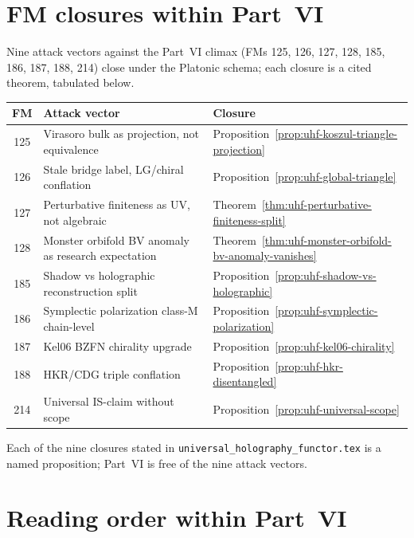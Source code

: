 \section{FM closures within Part~VI}
\label{sec:part-vi-fm-closures}

Nine attack vectors against the Part~VI climax (FMs 125, 126, 127,
128, 185, 186, 187, 188, 214) close under the Platonic schema; each
closure is a cited theorem, tabulated below.

\begin{center}
\begin{tabular}{c|p{5.5cm}|p{6.5cm}}
\hline
\textbf{FM} & \textbf{Attack vector} & \textbf{Closure} \\
\hline
125 & Virasoro bulk as projection, not equivalence & Proposition~\ref{prop:uhf-koszul-triangle-projection} \\
126 & Stale bridge label, LG/chiral conflation
 & Proposition~\ref{prop:uhf-global-triangle} \\
127 & Perturbative finiteness as UV, not algebraic
 & Theorem~\ref{thm:uhf-perturbative-finiteness-split} \\
128 & Monster orbifold BV anomaly as research expectation
 & Theorem~\ref{thm:uhf-monster-orbifold-bv-anomaly-vanishes} \\
185 & Shadow vs holographic reconstruction split
 & Proposition~\ref{prop:uhf-shadow-vs-holographic} \\
186 & Symplectic polarization class-M chain-level
 & Proposition~\ref{prop:uhf-symplectic-polarization} \\
187 & Kel06 BZFN chirality upgrade
 & Proposition~\ref{prop:uhf-kel06-chirality} \\
188 & HKR/CDG triple conflation
 & Proposition~\ref{prop:uhf-hkr-disentangled} \\
214 & Universal IS-claim without scope
 & Proposition~\ref{prop:uhf-universal-scope} \\
\hline
\end{tabular}
\end{center}

Each of the nine closures stated in
\texttt{universal\_holography\_functor.tex} is a named proposition;
Part~VI is free of the nine attack vectors.

\section{Reading order within Part~VI}
\label{sec:part-vi-reading-order}

